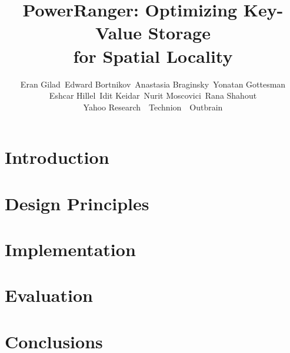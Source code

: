 \documentclass[letterpaper,twocolumn,10pt]{article}
\date{}
\newcommand{\sys}{PowerRanger}
\begin{document}
\title{\sys: Optimizing Key-Value Storage\\ for Spatial Locality} 
\author{
Eran Gilad\footnotemark[1] \ 
Edward Bortnikov\footnotemark[1] \
Anastasia Braginsky\footnotemark[1] \ 
Yonatan Gottesman\footnotemark[1]  \\
Eshcar Hillel\footnotemark[1]  \
Idit Keidar\footnotemark[1]\footnotemark[2] \ 
Nurit Moscovici\footnotemark[3]  \
Rana Shahout\footnotemark[2]\\ 
\footnotemark[1] Yahoo Research\ \ \footnotemark[2] Technion\ \ \footnotemark[3] Outbrain
}
\maketitle
\begin{abstract}

\end{abstract}



\section{Introduction}


\section{Design Principles}
\label{sec:principles}


%

\section{Implementation}
\label{sec:impl}


\section{Evaluation}
\label{sec:eval}


%

\section{Conclusions}
\label{sec:conclusions}






\end{document}
